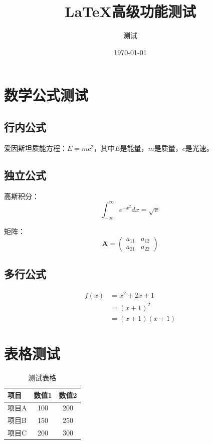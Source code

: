 \documentclass[12pt,a4paper]{article}
\title{LaTeX高级功能测试}
\author{测试}
\date{\today}
\begin{document}
\maketitle

\tableofcontents  %
\newpage

\section{数学公式测试}

\subsection{行内公式}

爱因斯坦质能方程：$E = mc^2$，其中$E$是能量，$m$是质量，$c$是光速。

\subsection{独立公式}

高斯积分：
\begin{equation}
\int_{-\infty}^{\infty} e^{-x^2} dx = \sqrt{\pi}
\label{eq:gaussian}
\end{equation}

矩阵：
\begin{equation}
\mathbf{A} = \begin{pmatrix}
a_{11} & a_{12} \\
a_{21} & a_{22}
\end{pmatrix}
\label{eq:matrix}
\end{equation}

\subsection{多行公式}

\begin{align}
f(x) &= x^2 + 2x + 1 \\
     &= (x+1)^2 \\
     &= (x+1)(x+1)
\label{eq:align}
\end{align}

\section{表格测试}

\begin{table}[H]
\centering
\caption{测试表格}
\label{tab:test}
\begin{tabular}{lcc}
\toprule
项目 & 数值1 & 数值2 \\
\midrule
项目A & 100 & 200 \\
项目B & 150 & 250 \\
项目C & 200 & 300 \\
\bottomrule
\end{tabular}
\end{table}
\end{document}
